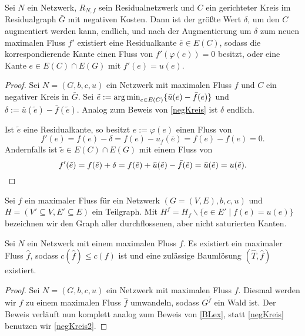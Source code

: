 \begin{lem}\label{negKreis2}Sei $N$ ein Netzwerk, $R_{N,f}$ sein Residualnetzwerk und $C$ ein gerichteter Kreis im Residualgraph $\bar{G}$ mit negativen Kosten. Dann ist der größte Wert $\delta$, um den $C$ augmentiert werden kann, endlich, und nach der Augmentierung um $\delta$ zum neuen maximalen Fluss $f'$ existiert eine Residualkante $\bar{e}\in E(C)$, sodass die korrespondierende Kante einen Fluss von $f'(\varphi(e))=0$ besitzt, oder eine Kante $e\in E(C)\cap E(G)$ mit $f'(e)=u(e)$.\end{lem}
\begin{proof}Sei $N=(G,b,c,u)$ ein Netzwerk mit maximalen Fluss $f$ und $C$ ein negativer Kreis in $\bar{G}$. Sei $\tilde{e}:=\operatorname*{arg\,min}_{e\in E(C)}\{\bar{u}(e)-\bar{f}(e)\}$ und $\delta:=\bar{u}(\tilde{e})-\bar{f}(\tilde{e})$. Analog zum Beweis von \cref{negKreis} ist $\delta$ endlich.
	
Ist $\tilde{e}$ eine Residualkante, so besitzt $e:=\varphi(e)$ einen Fluss von
\begin{equation*}
f'(e)=f(e)-\delta=f(e)-u_f(\bar{e})=f(e)-f(e)=0.\end{equation*} Andernfalls ist $\tilde{e}\in E(C)\cap E(G)$ mit einem Fluss von
\begin{equation*}
f'(\tilde{e})=f(\tilde{e})+\delta=f(\tilde{e})+\bar{u}(\tilde{e})-\bar{f}(\tilde{e})=\bar{u}(\tilde{e})=u(\tilde{e}).\qedhere\end{equation*}\end{proof}

\begin{nota}Sei $f$ ein maximaler Fluss für ein Netzwerk $(G=(V,E),b,c,u)$ und $H=(V'\subseteq V, E'\subseteq E)$ ein Teilgraph. Mit $H^f=H_f\backslash\{e\in E'\mid f(e)=u(e)\}$ bezeichnen wir den Graph aller durchflossenen, aber nicht saturierten Kanten.\end{nota}

\begin{thm}\label{BLex2}Sei $N$ ein Netzwerk mit einem maximalen Fluss $f$. Es existiert ein maximaler Fluss $\hat{f}$, sodass $c(\hat{f})\leq c(f)$ ist und eine zulässige Baumlösung $(\hat{T},\hat{f})$ existiert.\end{thm}
\begin{proof}Sei $N=(G,b,c,u)$ ein Netzwerk mit maximalen Fluss $f$. Diesmal werden wir $f$ zu einem maximalen Fluss $\hat{f}$ umwandeln, sodass $G^{\hat{f}}$ ein Wald ist. Der Beweis verläuft nun komplett analog zum Beweis von \cref{BLex}, statt \cref{negKreis} benutzen wir \cref{negKreis2}.\end{proof}

